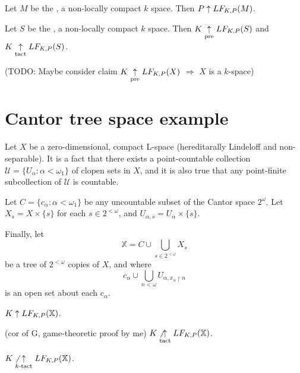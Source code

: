 \begin{thm}
  Let $M$ be the , a non-locally compact $k$ space.
  Then $P \uparrow LF_{K,P}(M)$.
\end{thm}

\begin{thm}
  Let $S$ be the , a non-locally compact $k$ space.
  Then $K \underset{\text{pre}}{\uparrow} LF_{K,P}(S)$ and $K\underset{\text{tact}}{\uparrow} LF_{K,P}(S)$.
\end{thm}

(TODO: Maybe consider claim
$K \underset{\text{pre}}{\uparrow} LF_{K,P}(X)$ $\Rightarrow$ $X$ is a $k$-space)





\section{Cantor tree space example}

\begin{ex}
  Let $X$ be a zero-dimensional, compact L-space
  (hereditarally Lindeloff and non-separable).
  It is a fact that there exists a point-countable collection
  $\mathcal{U}=\{U_\alpha : \alpha<\omega_1\}$ of clopen sets in $X$, and it is
  also true that any point-finite subcollection of $\mathcal{U}$ is countable.

  Let $C = \{c_\alpha : \alpha <\omega_1\}$ be any uncountable subset of the
  Cantor space $2^\omega$. Let $X_s = X \times \{s\}$ for each
  $s \in 2^{<\omega}$, and $U_{\alpha,s} = U_\alpha \times \{s\}$.

  Finally, let \[\mathbb{X} = C \cup \bigcup_{s\in 2^{<\omega}} X_s\] be a
  tree of $2^{<\omega}$ copies of $X$, and where
  \[c_\alpha \cup \bigcup_{n < \omega} U_{\alpha, x_\alpha \restriction n}\]
  is an open set about each $c_\alpha$.
\end{ex}

\begin{prop}
$K \uparrow LF_{K,P}(\mathbb{X})$.
\end{prop}

\begin{thm}(cor of G, game-theoretic proof by me)
$K\not\underset{\text{tact}}{\uparrow}LF_{K,P}(\mathbb{X})$.
\end{thm}

\begin{thm}
$K\not\underset{k\text{-tact}}{\uparrow}LF_{K,P}(\mathbb{X})$.
\end{thm}



